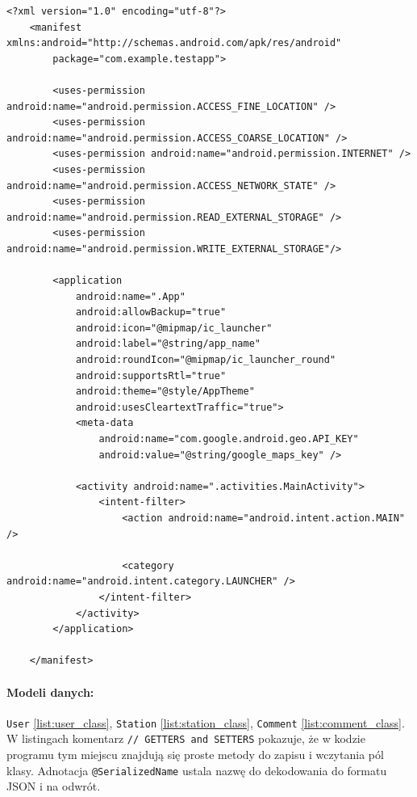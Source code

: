 \begin{lstlisting}[label=list:androidManifest,caption=androidManifest.xml,basicstyle=\tiny\ttfamily]
    <?xml version="1.0" encoding="utf-8"?>
    <manifest xmlns:android="http://schemas.android.com/apk/res/android"
        package="com.example.testapp">
    
        <uses-permission android:name="android.permission.ACCESS_FINE_LOCATION" />
        <uses-permission android:name="android.permission.ACCESS_COARSE_LOCATION" />
        <uses-permission android:name="android.permission.INTERNET" />
        <uses-permission android:name="android.permission.ACCESS_NETWORK_STATE" />
        <uses-permission android:name="android.permission.READ_EXTERNAL_STORAGE" />
        <uses-permission android:name="android.permission.WRITE_EXTERNAL_STORAGE"/>
    
        <application
            android:name=".App"
            android:allowBackup="true"
            android:icon="@mipmap/ic_launcher"
            android:label="@string/app_name"
            android:roundIcon="@mipmap/ic_launcher_round"
            android:supportsRtl="true"
            android:theme="@style/AppTheme"
            android:usesCleartextTraffic="true">
            <meta-data
                android:name="com.google.android.geo.API_KEY"
                android:value="@string/google_maps_key" />
    
            <activity android:name=".activities.MainActivity">
                <intent-filter>
                    <action android:name="android.intent.action.MAIN" />
    
                    <category android:name="android.intent.category.LAUNCHER" />
                </intent-filter>
            </activity>
        </application>
    
    </manifest>
\end{lstlisting}

\paragraph{Modeli danych:} \texttt{User} \ref{list:user_class}, \texttt{Station} \ref{list:station_class}, \texttt{Comment} \ref{list:comment_class}. W listingach komentarz \texttt{// GETTERS and SETTERS} pokazuje, że w kodzie programu tym miejscu znajdują się proste metody do zapisu i wczytania pól klasy.
Adnotacja \texttt{@SerializedName} ustala nazwę do dekodowania do formatu JSON i na odwrót.


